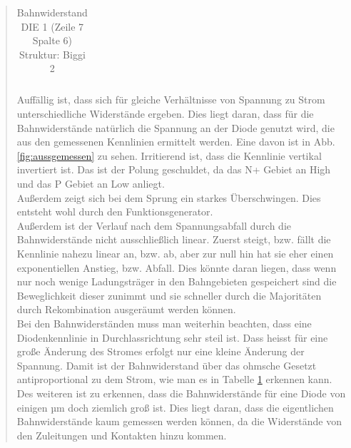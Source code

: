 \begin{quote}
\begin{table}[H]
\begin{addmargin}[3cm]{3cm}
\begin{tabular}{|p{3cm}|p{3cm}|p{3cm}|}
                    \end{tabular}
              \end{addmargin}
              \caption{Bahnwiderstand DIE 1 (Zeile 7 Spalte 6) Struktur: Biggi 2}
              \label{tab:bahnwid}
            \end{table}

    \vspace{2em}

    Auffällig ist, dass sich für gleiche Verhältnisse von Spannung zu Strom
    unterschiedliche Widerstände ergeben. Dies liegt daran, dass für die
    Bahnwiderstände natürlich die Spannung an der Diode genutzt wird, die aus
    den gemessenen Kennlinien ermittelt werden. Eine davon ist in Abb.
    \ref{fig:aussgemessen} zu sehen. Irritierend ist, dass die Kennlinie
    vertikal invertiert ist. Das ist der Polung geschuldet, da das N+ Gebiet an
    High und das P Gebiet an Low anliegt.\\
    Außerdem zeigt sich bei dem Sprung ein starkes Überschwingen. Dies entsteht
    wohl durch den Funktionsgenerator.\\
    Außerdem ist der Verlauf nach dem Spannungsabfall durch die Bahnwiderstände
    nicht ausschließlich linear. Zuerst steigt, bzw. fällt die Kennlinie nahezu
    linear an, bzw. ab, aber zur null hin hat sie eher einen exponentiellen Anstieg, bzw.
    Abfall. Dies könnte daran liegen, dass wenn nur noch wenige Ladungsträger
    in den Bahngebieten gespeichert sind die Beweglichkeit dieser zunimmt und
    sie schneller durch die Majoritäten durch Rekombination ausgeräumt werden
    können.\\
    Bei den Bahnwiderständen muss man weiterhin beachten, dass eine
    Diodenkennlinie in Durchlassrichtung sehr steil ist. Dass heisst für eine
    große Änderung des Stromes erfolgt nur eine kleine Änderung der Spannung.
    Damit ist der Bahnwiderstand über das ohmsche Gesetzt antiproportional zu
    dem Strom, wie man es in Tabelle \ref{tab:bahnwid} erkennen kann.\\
    Des weiteren ist zu erkennen, dass die Bahnwiderstände für eine Diode von
    einigen µm doch ziemlich groß ist. Dies liegt daran, dass die eigentlichen
    Bahnwiderstände kaum gemessen werden können, da die Widerstände von den
    Zuleitungen und Kontakten hinzu kommen.

    \vspace{2em}


\end{quote}
